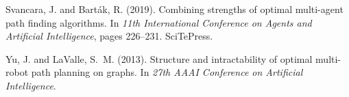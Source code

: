 \begin{thebibliography}{}
Svancara, J. and Bart{\'{a}}k, R. (2019).
\newblock Combining strengths of optimal multi-agent path finding algorithms.
\newblock In
{\em 11th International Conference on Agents and Artificial Intelligence},
pages 226--231.
SciTePress.

Yu, J. and LaValle, S.~M. (2013).
\newblock Structure and intractability of optimal multi-robot path planning on graphs.
\newblock In {\em 27th {AAAI} Conference on Artificial Intelligence}.

\end{thebibliography}

